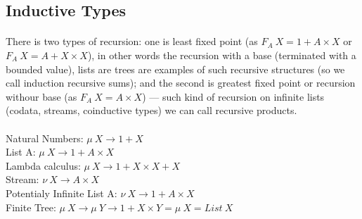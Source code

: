 \documentclass[11pt,oneside]{article}
\begin{document}
\begingroup
\parbox[t][][l]{0.40\textwidth}{

\begin{prooftree}
\end{prooftree}

\begin{prooftree}
\end{prooftree}

}
\hspace{0.1cm}
\parbox[t][][r]{0.60\textwidth}{


\begin{prooftree}
\end{prooftree}

}
\endgroup

\newpage
   \subsection{Inductive Types}

  \paragraph{}
  There is two types of recursion: one is least fixed point (as $F_A\ X = 1 + A\times X$ or $F_A\ X = A + X\times X$),
  in other words the recursion with a base (terminated with a bounded value), lists are trees are
  examples of such recursive structures (so we call induction recursive sums); and the second
  is greatest fixed point or recursion withour base (as $F_A\ X = A\times X $) --- such kind of
  recursion on infinite lists (codata, streams, coinductive types) we can call recursive products.\\
\\
  Natural Numbers: $\mu\ X \rightarrow 1 + X$ \\
  List A: $\mu\ X \rightarrow 1 + A \times X$ \\
  Lambda calculus: $\mu\ X \rightarrow 1 + X \times X + X$ \\
  Stream: $\nu\ X \rightarrow A \times X$ \\
  Potentialy Infinite List A: $\nu\ X \rightarrow 1 + A \times X$ \\
  Finite Tree: $\mu\ X \rightarrow \mu\ Y \rightarrow 1 + X \times Y = \mu\ X = List\ X$ \\
\end{document}

